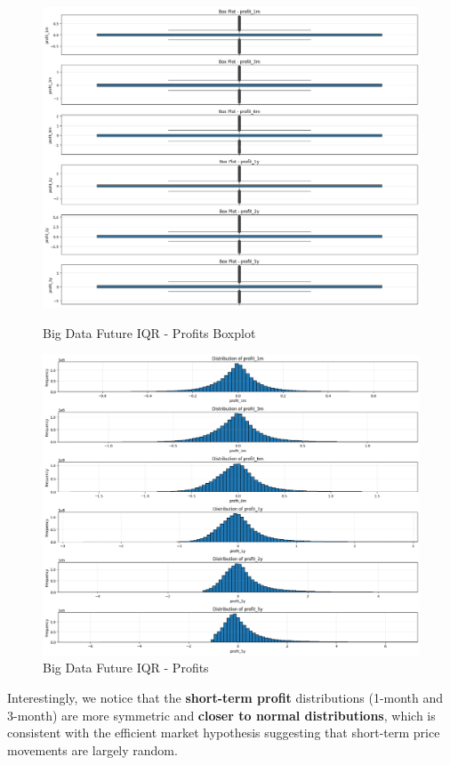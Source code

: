 \documentclass[11pt,english,a4paper,hidelinks]{book}
\begin{document}
\begin{figure}[H]
    \centering
    \begin{minipage}{0.48\textwidth}
        \centering
        \includegraphics[width=0.8\linewidth]{images/code/descriptive analysis/distributions/Big Data future IQR - Profits Boxplot.png}
        \caption{Big Data Future IQR - Profits Boxplot}
        \label{fig:big_data_future_iqr_profits_boxplot}
    \end{minipage}\hfill
    \begin{minipage}{0.48\textwidth}
        \centering
        \includegraphics[width=0.8\linewidth]{images/code/descriptive analysis/distributions/Big Data Future IQR - Profits.png}
        \caption{Big Data Future IQR - Profits}
        \label{fig:big_data_future_iqr_profits_iqr}
    \end{minipage}
\end{figure}


\vspace{0.5cm}
\noindent Interestingly, we notice that the \textbf{short-term profit} distributions (1-month and 3-month) are more symmetric and \textbf{closer to normal distributions}, which is consistent with the efficient market hypothesis suggesting that short-term price movements are largely random. 
\end{document}
